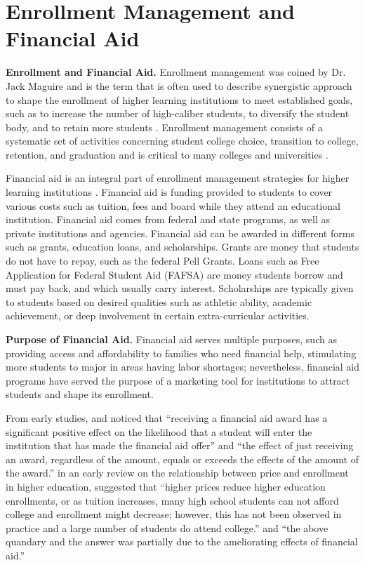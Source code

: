 \documentclass[12pt,english]{report}
\begin{document}
\section{Enrollment Management and Financial Aid}

\noindent \textbf{Enrollment and Financial Aid.} Enrollment management was coined by Dr. Jack Maguire \citep{Maguire1976} and is the term that is often used to describe synergistic approach to shape the enrollment of higher learning institutions to meet established goals, such as to increase the number of high-caliber students, to diversify the student body, and to retain more students \citep{Kemerer1982}. Enrollment management consists of a systematic set of activities concerning student college choice, transition to college, retention, and graduation \citep{Hossler1990} and is critical to many colleges and universities \citep{Braunstein1999, Maltz2007, Aksenova2006}. 

Financial aid is an integral part of enrollment management strategies for higher learning institutions \citep{Dynarski2013}.  Financial aid is funding provided to students to cover various costs such as tuition, fees and board  while they attend an educational institution. Financial aid comes from federal and state programs, as well as private institutions and agencies. Financial aid can be awarded in different forms such as grants, education loans, and scholarships. Grants are money that students do not have to repay, such as the  federal Pell Grants. Loans such as Free Application for  Federal Student Aid (FAFSA) are money students borrow and  must pay back, and which usually carry interest. Scholarships are typically given  to students  based on desired qualities such as athletic ability, academic  achievement, or deep involvement in certain extra-curricular activities. 

\vspace{0.15in}
\noindent \textbf{Purpose of Financial Aid.} Financial aid serves multiple purposes, such as providing access and affordability to families who need financial help, stimulating more students to major in areas having labor shortages; nevertheless, financial aid programs have served the purpose of a marketing tool for institutions to attract students and shape its enrollment. 

From early studies, \citet{Heller1997} and \citet{Leslie1988} noticed that ``receiving a financial aid award has a significant positive effect on the likelihood that a student will enter the institution that has made the financial aid offer'' and ``the effect of just receiving an award, regardless of the amount, equals or exceeds the effects of the amount of the award.'' \citep{Leslie1987} in an early review on the relationship between price and enrollment in higher education, suggested that ``higher prices reduce higher education enrollments, or as tuition increases, many high school students can not afford college and enrollment might decrease; however, this has not been observed in practice and a large number of students do attend college.'' and ``the above quandary and the answer was partially due to the ameliorating effects of financial aid.''
\end{document}
